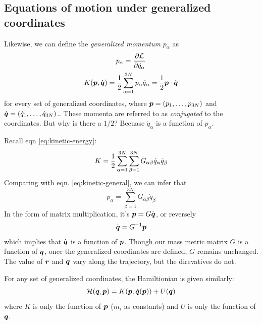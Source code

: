 \subsection{Equations of motion under generalized coordinates}

Likewise, we can define the \textit{generalized momentum} $p_\alpha$ as
\begin{gather}
	p_\alpha=\dfrac{\partial \mathcal{L}}{\partial \dot{q}_\alpha} \label{eq:palpha}\\
	K(\boldsymbol{p},\dot{\boldsymbol{q}})=\dfrac{1}{2}\sum_{\alpha=1}^{3N} p_\alpha\dot{q}_\alpha=\dfrac{1}{2}\boldsymbol{p}\cdot\dot{\boldsymbol{q}} \label{eq:kinetic-general}
\end{gather}
for every set of generalized coordinates, where $\boldsymbol{p}=(p_1,\dots,p_{3N})$ and $\dot{\boldsymbol{q}}=(\dot{q}_1,\dots,\dot{q}_{3N})$.. These momenta are referred to as \textit{conjugated} to the coordinates. But why is there a $1/2$? Becuase $\dot{q}_\alpha$ is a function of $p_\alpha$.

Recall eqn \ref{eq:kinetic-energy}:
\begin{equation*}
	K=\dfrac{1}{2}\sum_{\alpha=1}^{3N}\sum_{\beta=1}^{3N}G_{\alpha\beta}\dot{q}_\alpha\dot{q}_\beta
\end{equation*}
Comparing with eqn. \ref{eq:kinetic-general}, we can infer that
\begin{equation}
	p_\alpha=\sum_{\beta=1}^{3N}G_{\alpha\beta}\dot{q}_\beta
\end{equation}
In the form of matrix multiplication, it's $\boldsymbol{p}=G\dot{\boldsymbol{q}}$, or reversely
\begin{equation}
	\dot{\boldsymbol{q}}=G^{-1}\boldsymbol{p}
\end{equation}
which implies that $\dot{\boldsymbol{q}}$ is a function of $\boldsymbol{p}$. Though our mass metric matrix $G$ is a function of $\boldsymbol{q}$, once the generalized coordinates are defined, $G$ remains unchanged. The value of $\boldsymbol{r}$ and $\boldsymbol{q}$ vary along the trajectory, but the direvatives do not.

For any set of generalized coordinates, the Hamiltionian is given similarly:
\begin{equation}
	\mathcal{H}(\boldsymbol{q},\boldsymbol{p})=K(\boldsymbol{p},\dot{\boldsymbol{q}}(\boldsymbol{p}))+U(\boldsymbol{q}) \label{eq:hamiltonian}
\end{equation}
where $K$ is only the function of $\boldsymbol{p}$ ($m_i$ as constants) and $U$ is only the function of $\boldsymbol{q}$.

